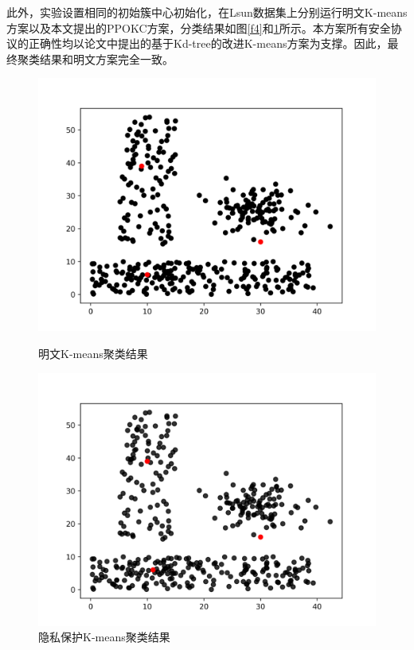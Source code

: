 此外，实验设置相同的初始簇中心初始化，在Lsun数据集上分别运行明文K-means方案以及本文提出的PPOKC方案，分类结果如图\ref{f4}和\ref{f5}所示。本方案所有安全协议的正确性均以论文\cite{kanungo2002efficient}中提出的基于Kd-tree的改进K-means方案为支撑。因此，最终聚类结果和明文方案完全一致。
\begin{figure}[htbp] %
	\begin{minipage}[t]{0.5\linewidth}
		\includegraphics[width=\linewidth]{img/lsun_ptxt.png}
		\caption{明文K-means聚类结果}
		\label{f4}
	\end{minipage}%
	\hfill%
	\begin{minipage}[t]{0.5\linewidth}
		\includegraphics[width=\linewidth]{img/lsun_ctxt.png}
		\caption{隐私保护K-means聚类结果}
		\label{f5}
	\end{minipage}
\end{figure}
